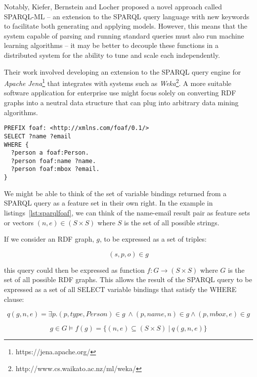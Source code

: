 Notably, Kiefer, Bernstein and Locher\cite{kiefer2008adding} proposed a novel
approach called SPARQL-ML -- an extension to the
SPARQL\cite{segaran2009programming} query language with new keywords to
facilitate both generating and applying models. However, this means that the system
capable of parsing and running standard queries must also run machine learning
algorithms -- it may be better to decouple these functions in a distributed
system for the ability to tune and scale each independently.

Their work involved developing an extension to the SPARQL query
engine for \emph{Apache Jena}\footnote{https://jena.apache.org/} that integrates
with systems such as \emph{Weka}\footnote{http://www.cs.waikato.ac.nz/ml/weka/}.
A more suitable software application for enterprise use might focus solely on
converting RDF graphs into a neutral data structure that can plug into arbitrary
data mining algorithms.

\begin{lstlisting}[label=lst:sparqlfoaf,caption={Example SPARQL query for people's names and email addresses},language=sparql]
PREFIX foaf: <http://xmlns.com/foaf/0.1/>
SELECT ?name ?email
WHERE {
  ?person a foaf:Person.
  ?person foaf:name ?name.
  ?person foaf:mbox ?email.
}
\end{lstlisting}

We might be able to think of the set of variable bindings returned from a
SPARQL query as a feature set in their own right. In the example in
listings~\ref{lst:sparqlfoaf}, we can think of the name-email result pair
as feature sets or vectors $(n,e) \in (S \times S)$ where $S$ is the set of
all possible strings.

If we consider an RDF graph, $g$, to be expressed as a set of triples:

\begin{displaymath}
  (s, p, o) \in g
\end{displaymath}

\noindent this query could then be
expressed as function $f: G \rightarrow (S \times S)$ where $G$ is the set of
all possible RDF graphs.
This allows the result of the
SPARQL query to be expressed as a set of all SELECT variable bindings that
satisfy the WHERE clause:

$$
q(g,n,e) = \exists p . (p, type, Person) \in g\ \land (p, name, n) \in g \land (p, mbox, e) \in g
$$

$$
g \in G \models f(g) = \{(n, e) \subseteq (S \times S) \: | \: q(g,n,e)\}
$$

